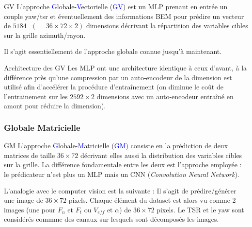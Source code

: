 \documentclass[
11pt,notheorems,hyperref={pdfauthor=whatever}
]{beamer}
\begin{document}
\begin{frame}{GV}
    L'approche \textcolor{blue}{G}lobale-\textcolor{blue}{V}ectorielle (\textcolor{blue}{GV}) est un MLP prenant en 
    entrée un couple yaw/tsr et éventuellement des informations BEM pour prédire un  vecteur de $5184 \text{ }(= 36 \times 72 \times 2)$ dimensions
    décrivant la répartition des variables cibles sur la grille azimuth/rayon. 

    \vspace{0.3cm}

    Il s'agit essentiellement de l'approche globale connue jusqu'à maintenant.
\end{frame}

\begin{frame}{Architecture des GV}
    Les MLP ont une architecture identique à ceux d'avant, à la différence près qu'une compression
    par un auto-encodeur de la dimension est utilisé afin d'accélérer la procédure d'entraînement 
    (on diminue le coût de l'entrainement sur les $2592 \times 2$ dimensions avec un auto-encodeur
    entraîné en amont pour réduire la dimension).
\end{frame}

\subsubsection{Globale Matricielle}

\begin{frame}{GM}
    L'approche \textcolor{blue}{G}lobale-\textcolor{blue}{M}atricielle (\textcolor{blue}{GM}) consiste en la prédiction de deux matrices de taille
    $36 \times 72$ décrivant elles aussi la distribution des variables cibles sur la grille. La différence fondamentale entre les
    deux est l'approche employée : le prédicateur n'est plus un MLP mais un CNN (\textit{Convolution Neural Network}).

    \vspace{0.3cm}

    L'analogie avec le computer vision est la suivante : Il s'agit de prédire/générer une image de $36 \times 72$ pixels. 
    Chaque élément du dataset est alors vu comme 2 images (une pour $F_n \text{ et } F_t$ ou $V_{eff} \text{ et } \alpha$) de $36 \times 72$ pixels.
    Le TSR et le yaw sont considérés commme des canaux sur lesquels sont décomposés les images.  
\end{frame}
\end{document}
